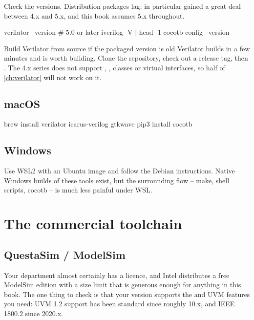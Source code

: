 Check the versions. Distribution packages lag:  in particular
gained a great deal between 4.x and 5.x, and this book assumes 5.x throughout.

\begin{shcode}
verilator --version    # 5.0 or later
iverilog -V | head -1
cocotb-config --version
\end{shcode}

\begin{tipbox}{Build Verilator from source if the packaged version is old}
Verilator builds in a few minutes and is worth building. Clone the repository,
check out a release tag, then . The 4.x series does not support ,
, classes or virtual interfaces, so half of
\cref{ch:verilator} will not work on it.
\end{tipbox}

\subsection{macOS}

\begin{shcode}
brew install verilator icarus-verilog gtkwave
pip3 install cocotb
\end{shcode}

\subsection{Windows}

Use WSL2 with an Ubuntu image and follow the Debian instructions. Native
Windows builds of these tools exist, but the surrounding flow -- make, shell
scripts, cocotb -- is much less painful under WSL.

\section{The commercial toolchain}

\subsection{QuestaSim / ModelSim}

Your department almost certainly has a licence, and Intel distributes a free
ModelSim edition with a size limit that is generous enough for anything in this
book. The one thing to check is that your version supports the \SV{} and UVM
features you need: UVM 1.2 support has been standard since roughly 10.x, and
IEEE 1800.2 since 2020.x.

